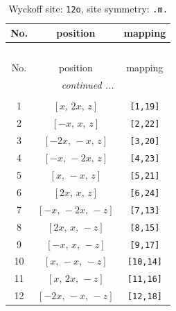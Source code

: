 \documentclass[fleqn,8pt]{jsarticle}
\begin{document}
\begin{longtable}{ccc}
\caption{Wyckoff site: {\tt 12o}, site symmetry: {\tt .m.}}
 \\
 \hline \hline
No. & position & mapping \\ \hline \endfirsthead

\multicolumn{2}{l}{\tablename\ \thetable{}} \\
 \hline \hline
No. & position & mapping \\ \hline \endhead

 \hline \hline
\multicolumn{2}{r}{\footnotesize\it continued ...} \\ \endfoot

 \hline \hline
\multicolumn{2}{r}{} \\ \endlastfoot

1 & $\left[ x,\, 2 x,\, z \right]$ & {\tt [1,19]} \\ \hline
2 & $\left[ - x,\, x,\, z \right]$ & {\tt [2,22]} \\ \hline
3 & $\left[ - 2 x,\, - x,\, z \right]$ & {\tt [3,20]} \\ \hline
4 & $\left[ - x,\, - 2 x,\, z \right]$ & {\tt [4,23]} \\ \hline
5 & $\left[ x,\, - x,\, z \right]$ & {\tt [5,21]} \\ \hline
6 & $\left[ 2 x,\, x,\, z \right]$ & {\tt [6,24]} \\ \hline
7 & $\left[ - x,\, - 2 x,\, - z \right]$ & {\tt [7,13]} \\ \hline
8 & $\left[ 2 x,\, x,\, - z \right]$ & {\tt [8,15]} \\ \hline
9 & $\left[ - x,\, x,\, - z \right]$ & {\tt [9,17]} \\ \hline
10 & $\left[ x,\, - x,\, - z \right]$ & {\tt [10,14]} \\ \hline
11 & $\left[ x,\, 2 x,\, - z \right]$ & {\tt [11,16]} \\ \hline
12 & $\left[ - 2 x,\, - x,\, - z \right]$ & {\tt [12,18]} \\
\end{longtable}
\renewcommand{\arraystretch}{1.2}
\end{document}
